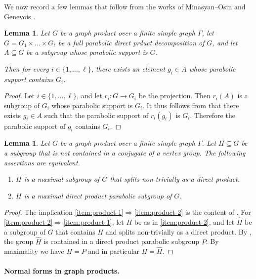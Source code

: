 \documentclass[a4paper,english,11pt]{article}
\newtheorem{lemma}[de]{Lemma}
\theoremstyle{definition}
\theoremstyle{remark}
\begin{document}
We now record a few lemmas that follow from the works of Minasyan--Osin \cite{MO} and Genevois \cite{Gen}.

\begin{lemma}\label{lemma:cu}
 Let $G$ be a graph product over a finite simple graph $\Gamma$, let $G=G_1\times\dots\times G_\ell$ be a full parabolic direct prduct decomposition of $G$, and let $A\subseteq G$ be a subgroup whose parabolic support is $G$.

 Then for every $i\in\{1,\dots,\ell\}$, there exists an element $g_i\in A$ whose parabolic support contains $G_i$.
\end{lemma}

\begin{proof}
Let $i\in\{1,\dots,\ell\}$, and let $r_i:G\to G_i$ be the projection. Then $r_i(A)$ is a subgroup of $G_i$ whose parabolic support is $G_i$. It thus follows from \cite[Theorem~6.16]{MO} that there exists $g_i\in A$ such that the parabolic support of $r_i(g_i)$ is $G_i$. Therefore the parabolic support of $g_i$ contains $G_i$. 
\end{proof}

\begin{lemma}\label{lemma:maximal-direct-product}
Let $G$ be a graph product over a finite simple graph $\Gamma$. Let $H\subseteq G$ be a subgroup that is not contained in a conjugate of a vertex group. The following assertions are equivalent.
\begin{enumerate}
\item\label{item:product-1} $H$ is a maximal subgroup of $G$ that splits non-trivially as a direct product.
\item\label{item:product-2} $H$ is a maximal direct product parabolic subgroup of $G$. 
\end{enumerate}
\end{lemma}

\begin{proof}
The implication \ref{item:product-1}$\Rightarrow$\ref{item:product-2} is the content of \cite[Proposition~2.8]{Gen}. For \ref{item:product-2}$\Rightarrow$\ref{item:product-1}, let $H$ be as in \ref{item:product-2}, and let $\hat H$ be a subgroup of $G$ that contains $H$ and splits non-trivially as a direct product. By \cite[Corollary~6.15]{MO}, the group $\hat H$ is contained in a direct product parabolic subgroup $P$. By maximality we have $H=P$ and in particular $H=\hat H$.
\end{proof}


\paragraph*{Normal forms in graph products.}\label{Def:Normal-forms}
\end{document}
